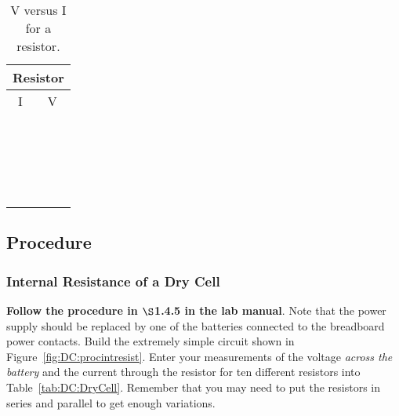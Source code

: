 \begin{table}[t]
\begin{center}
\begin{tabular}{|c|c|}
\hline
\multicolumn{2}{|c|}{Resistor}\\
\hline
I & V \\
\hline
\hspace*{5cm} & \hspace*{5cm} \\
& \\
\hline
& \\
& \\
\hline
& \\
& \\
\hline
& \\
& \\
\hline
& \\
& \\
\hline
& \\
& \\
\hline
& \\
& \\
\hline
& \\
& \\
\hline
& \\
& \\
\hline
& \\
& \\
\hline
\end{tabular}
\end{center}
\caption{V versus I for a resistor.}
\label{tab:DC:resistor}
\end{table}


\vfill
\newpage


\subsection{Procedure}



\subsubsection{Internal Resistance of a Dry Cell} 

{\bf Follow the procedure in $\S$1.4.5 in the lab manual}.
Note that the power supply should be replaced by one of the 
batteries connected to the breadboard power contacts. 
Build the extremely simple circuit
shown in Figure~\ref{fig:DC:procintresist}. 
Enter your measurements of the voltage {\it across the battery} 
and the current
through the resistor for ten different resistors into 
Table~\ref{tab:DC:DryCell}.  Remember that you may need to put
the resistors in series and parallel to get enough variations.

